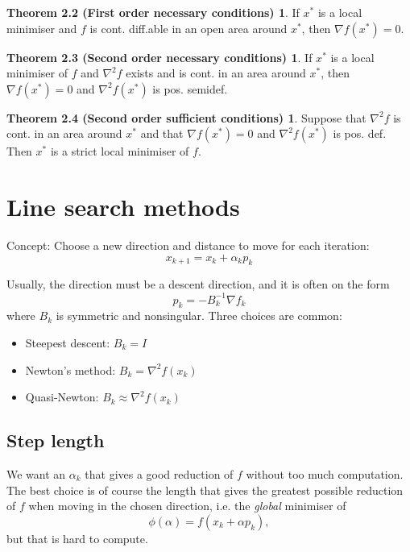 \documentclass[a4paper, 12pt]{article}
\theoremstyle{definition}
\begin{document}
\newtheorem*{1-order-necessary}{Theorem 2.2 (First order necessary conditions)}
\begin{1-order-necessary}
	If \( x^* \) is a local minimiser and \(f\) is cont. diff.able in an open area around \( x^* \), then \( \nabla f(x^*) = 0 \).
\end{1-order-necessary}

\newtheorem*{2-order-necessary}{Theorem 2.3 (Second order necessary conditions)}
\begin{2-order-necessary}
	If \( x^* \) is a local minimiser of \(f\) and \( \nabla^2 f \) exists and is cont. in an area around \( x^* \), then \( \nabla f(x^*) = 0 \) and \( \nabla^2 f(x^*)\) is pos. semidef.
\end{2-order-necessary}

\newtheorem*{2-order-sufficient}{Theorem 2.4 (Second order sufficient conditions)}
\begin{2-order-sufficient}
	Suppose that \( \nabla^2 f \) is cont. in an area around \( x^* \) and that \( \nabla f(x^*) = 0 \) and \( \nabla^2 f(x^*) \) is pos. def. Then \( x^* \) is a strict local minimiser of \(f\).
\end{2-order-sufficient}

\section{Line search methods}
Concept: Choose a new direction and distance to move for each iteration:
\begin{equation}
	x_{k+1} = x_k + \alpha_k p_k
\end{equation}

Usually, the direction must be a descent direction, and it is often on the form
\begin{equation}
	p_k = - B_k^{-1} \nabla f_k
\end{equation}
where \(B_k\) is symmetric and nonsingular. Three choices are common:
\begin{itemize}
	\item Steepest descent: \(B_k = I\)
	\item Newton's method:  \(B_k = \nabla^2 f(x_k) \)
	\item Quasi-Newton:     \(B_k \approx \nabla^2 f(x_k) \)
\end{itemize}

\subsection{Step length}
We want an \( \alpha_k \) that gives a good reduction of \(f\) without too much computation. The best choice is of course the length that gives the greatest possible reduction of \(f\) when moving in the chosen direction, i.e. the \emph{global} minimiser of
\begin{equation}
	\phi (\alpha) = f(x_k + \alpha p_k)
	,
\end{equation}
but that is hard to compute.
\end{document}
